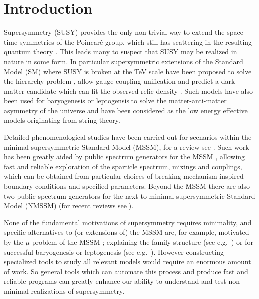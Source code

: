 \documentclass[final,3p,11pt,pdflatex]{elsarticle}
\begin{document}
\newpage
\section{Introduction}

Supersymmetry (SUSY) provides the only non-trivial way to extend the
space-time symmetries of the Poincar\'e
group, which still has scattering in the resulting quantum theory \cite{Coleman:1967ad,Haag:1974qh}. This leads many to suspect that
SUSY may be realized in nature in some form. In particular
supersymmetric extensions of the Standard Model (SM) where SUSY is broken
at the TeV scale have been proposed to solve the hierarchy
problem \cite{Weinberg:1975gm, Weinberg:1979bn, Gildener:1976ai,
  Susskind:1978ms, 'tHooft:1980xb}, allow gauge coupling
unification \cite{Langacker:1990jh, Ellis:1990wk, Amaldi:1991cn,
  Langacker:1991an, Giunti:1991ta} and predict a dark matter candidate
which can fit the observed relic
density \cite{Goldberg:1983nd,Ellis:1983ew}.  Such models have also
been used for baryogenesis or leptogensis to solve the
matter-anti-matter asymmetry of the universe and have been considered
as the low energy effective models originating from string
theory.

Detailed phenomenological studies have been carried out for scenarios
within the minimal supersymmetric Standard Model (MSSM), for a review
see \cite{Chung:2003fi}.  Such work has been greatly aided by public
spectrum generators for the MSSM
\cite{Allanach:2001kg,Porod:2003um,Djouadi:2002ze,Baer:1993ae,Chowdhury:2011zr},
allowing fast and reliable exploration of the sparticle spectrum,
mixings and couplings, which can be obtained from particular choices
of breaking mechanism inspired boundary conditions and specified
parameters. Beyond the MSSM there are also two public spectrum
generators \cite{Ellwanger:2004xm, Ellwanger:2005dv,
  Ellwanger:2006rn,Ellwanger:2008py, Allanach:2013kza} for the next to
minimal supersymmetric Standard Model (NMSSM)  (for
recent reviews see \cite{Ellwanger:2009dp, Maniatis:2009re}).



None of the fundamental motivations of supersymmetry requires
minimality, and specific alternatives to (or extensions of) the MSSM
are, for example, motivated by the $\mu$-problem of the MSSM
\cite{Kim:1983dt}; explaining the family structure (see
e.g.~\cite{King:2014nza}) or for successful baryogenesis or
leptogenesis (see e.g.~\cite{King:2008qb}). However constructing
specialized tools to study all relevant models would require an
enormous amount of work.  So general tools which can automate this
process and produce fast and reliable programs can greatly enhance our
ability to understand and test non-minimal realizations of
supersymmetry.
\end{document}
